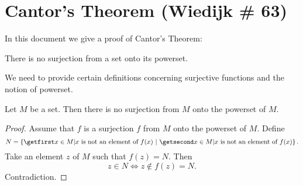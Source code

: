 \documentclass{article}
\begin{document}
\section{Cantor's Theorem (Wiedijk \# 63)}

In this document we give a proof of Cantor's Theorem:

  \begin{theorem*}
    There is no surjection from a set onto its powerset.
  \end{theorem*}

  We need to provide certain definitions concerning surjective
  functions and the notion of powerset.
\begin{forthel}
    \begin{theorem*}[Cantor]
      Let $M$ be a set. Then there is 
      no surjection from $M$ onto the powerset of $M$.
    \end{theorem*}
    \begin{proof}
      Assume that $f$ is
      a surjection $f$ from $M$ onto the powerset of $M$.
      Define \[ N = \class{x \in M | \text{$x$ is not an element of $f(x)$}}. \]
      Take an element $z$ of $M$ such that $f(z) = N$.
      Then \[ z \in N \iff z \notin f(z) = N. \]
      Contradiction.
    \end{proof}
\end{forthel}
\end{document}
